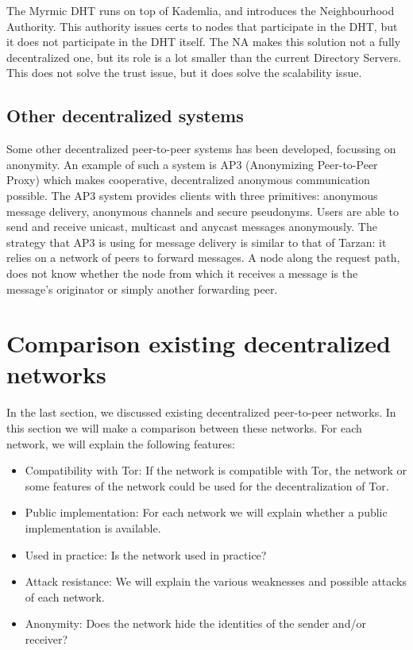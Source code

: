 \documentclass{article}
\begin{document}
		The Myrmic DHT runs on top of Kademlia, and introduces the Neighbourhood Authority. This authority issues certs to nodes that participate in the DHT, but it does not participate in the DHT itself. The NA makes this solution not a fully decentralized one, but its role is a lot smaller than the current Directory Servers. This does not solve the trust issue, but it does solve the scalability issue.
		
	\subsection{Other decentralized systems}
		Some other decentralized peer-to-peer systems has been developed, focussing on anonymity. An example of such a system is AP3 (Anonymizing Peer-to-Peer Proxy) \cite{mislove2004ap3} which makes cooperative, decentralized anonymous communication possible. The AP3 system provides clients with three primitives: anonymous message delivery, anonymous channels and secure pseudonyms. Users are able to send and receive unicast, multicast and anycast messages anonymously. The strategy that AP3 is using for message delivery is similar to that of Tarzan: it relies on a network of peers to forward messages. A node along the request path, does not know whether the node from which it receives a message is the message's originator or simply another forwarding peer.

\section{Comparison existing decentralized networks}
	\label{sec:comparison}
	
	
	
	In the last section, we discussed existing decentralized peer-to-peer networks. In this section we will make a comparison between these networks. For each network, we will explain the following features:

	\begin{itemize}
		\item{Compatibility with Tor:} If the network is compatible with Tor, the network or some features of the network could be used for the decentralization of Tor.
		\item{Public implementation:} For each network we will explain whether a public implementation is available.
		\item{Used in practice:} Is the network used in practice?
		\item{Attack resistance:} We will explain the various weaknesses and possible attacks of each network.
		\item{Anonymity:} Does the network hide the identities of the sender and/or receiver?
	\end{itemize}
	
\end{document}
